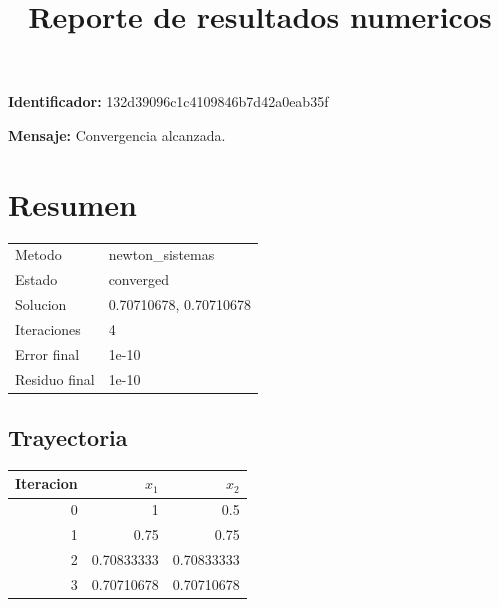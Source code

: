 \documentclass{article}
\title{Reporte de resultados numericos}
\begin{document}
\maketitle
\noindent \textbf{Identificador:} 132d39096c1c4109846b7d42a0eab35f\par
\textbf{Mensaje:} Convergencia alcanzada.\par
\section*{Resumen}
\begin{tabular}{ll}
\hline
Metodo & newton\_sistemas \\
Estado & converged \\
Solucion & 0.70710678, 0.70710678 \\
Iteraciones & 4 \\
Error final & 1e-10 \\
Residuo final & 1e-10 \\
\hline
\end{tabular}
\subsection*{Trayectoria}
\begin{longtable}{rrr}
Iteracion & $x_1$ & $x_2$ \\
\hline
0 & 1 & 0.5 \\
1 & 0.75 & 0.75 \\
2 & 0.70833333 & 0.70833333 \\
3 & 0.70710678 & 0.70710678 \\
\end{longtable}
\end{document}
